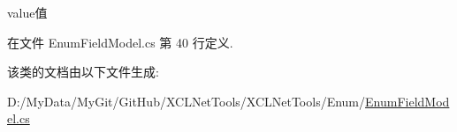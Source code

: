 value值 



在文件 Enum\-Field\-Model.\-cs 第 40 行定义.



该类的文档由以下文件生成\-:\begin{DoxyCompactItemize}
\item 
D\-:/\-My\-Data/\-My\-Git/\-Git\-Hub/\-X\-C\-L\-Net\-Tools/\-X\-C\-L\-Net\-Tools/\-Enum/\hyperlink{_enum_field_model_8cs}{Enum\-Field\-Model.\-cs}\end{DoxyCompactItemize}
